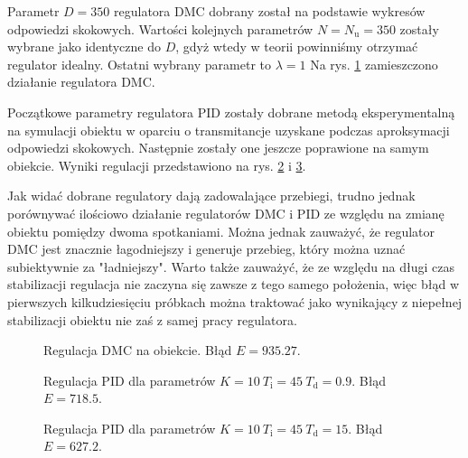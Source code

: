 Parametr $ D = 350 $ regulatora DMC dobrany został na podstawie wykresów odpowiedzi skokowych. Wartości kolejnych parametrów $ N = N_\mathrm{u} = 350 $ zostały wybrane jako identyczne do $ D $, gdyż wtedy w teorii powinniśmy otrzymać regulator idealny. Ostatni wybrany parametr to $ \lambda = 1 $ Na rys. \ref{R7} zamieszczono działanie regulatora DMC.

Początkowe parametry regulatora PID zostały dobrane metodą eksperymentalną na symulacji obiektu w oparciu o transmitancje uzyskane podczas aproksymacji odpowiedzi skokowych. Następnie zostały one jeszcze poprawione na samym obiekcie. Wyniki regulacji przedstawiono na rys. \ref{R8} i \ref{R9}.

Jak widać dobrane regulatory dają zadowalające przebiegi, trudno jednak porównywać ilościowo działanie regulatorów DMC i PID ze względu na zmianę obiektu pomiędzy dwoma spotkaniami. Można jednak zauważyć, że regulator DMC jest znacznie łagodniejszy i generuje przebieg, który można uznać subiektywnie za "ładniejszy". Warto także zauważyć, że ze względu na długi czas stabilizacji regulacja nie zaczyna się zawsze z tego samego położenia, więc błąd w pierwszych kilkudziesięciu próbkach można traktować jako wynikający z niepełnej stabilizacji obiektu nie zaś z samej pracy regulatora.

\begin{figure}[ht]
\centering

\caption{Regulacja DMC na obiekcie. Błąd $E = \num{935.27}$.}
\label{R7}
\end{figure}

\begin{figure}[ht]
\centering

\caption{Regulacja PID dla parametrów $K = 10 ~ T_\mathrm{i} = 45 ~ T_\mathrm{d} = \num{0.9}$. Błąd $E = \num{718.5}$.}
\label{R8}
\end{figure}

\begin{figure}[ht]
\centering

\caption{Regulacja PID dla parametrów $K = 10 ~ T_\mathrm{i} = 45 ~ T_\mathrm{d} = \num{15}$. Błąd $E = \num{627.2}$.}
\label{R9}
\end{figure}
